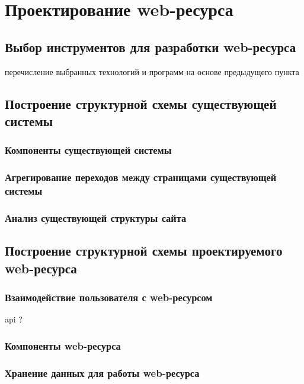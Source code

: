 \section{Проектирование web-ресурса}
    \subsection{Выбор инструментов для разработки web-ресурса}
        перечисление выбранных технологий и программ на основе предыдущего пункта
        
    \subsection{Построение структурной схемы существующей системы}
        \subsubsection{Компоненты существующей системы}                                         %

        \subsubsection{Агрегирование переходов между страницами существующей системы}          %

        \subsubsection{Анализ существующей структуры сайта}                                   %

    \subsection{Построение структурной схемы проектируемого web-ресурса}
        \subsubsection{Взаимодействие пользователя с web-ресурсом}                            %
            api ?

        \subsubsection{Компоненты web-ресурса}                                                %

        \subsubsection{Хранение данных для работы web-ресурса}                                  %
    

\clearpage
